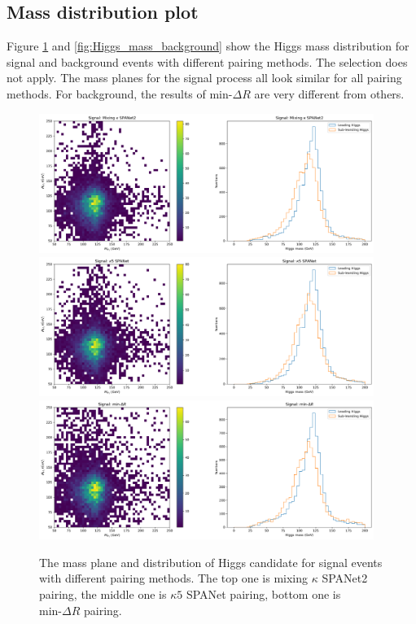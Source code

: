 \documentclass[12pt]{article}
\begin{document}
	\subsection{Mass distribution plot}%
	\label{sub:mass_distribution_plot}
		Figure \ref{fig:Higgs_mass_signal} and \ref{fig:Higgs_mass_background} show the Higgs mass distribution for signal and background events with different pairing methods. The selection does not apply. The mass planes for the signal process all look similar for all pairing methods. For background, the results of $\text{min-}\Delta R$ are very different from others.
		\begin{figure}[htpb]
			\centering
			\includegraphics[width=0.97\textwidth]{Higgs_mass_mix-SPANET2_s.png}
			\includegraphics[width=0.97\textwidth]{Higgs_mass_k5-SPANET_s.png}
			\includegraphics[width=0.97\textwidth]{Higgs_mass_mindR_s.png}
			\caption{The mass plane and distribution of Higgs candidate for signal events with different pairing methods. The top one is mixing $\kappa$ SPANet2 pairing, the middle one is $\kappa 5$ SPANet pairing, bottom one is $\text{min-}\Delta R$ pairing.}
			\label{fig:Higgs_mass_signal}
		\end{figure}
\end{document}
